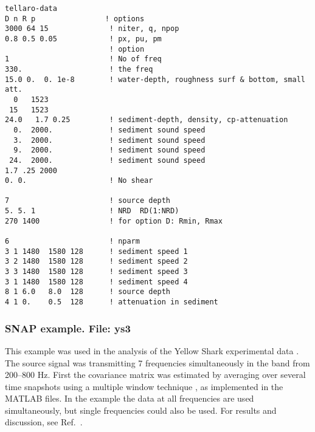 \documentclass{saclantc}
\begin{document}
\small
\begin{verbatim}
tellaro-data
D n R p                ! options 
3000 64 15              ! niter, q, npop
0.8 0.5 0.05            ! px, pu, pm
                        ! option
1                       ! No of freq
330.                    ! the freq
15.0 0.  0. 1e-8        ! water-depth, roughness surf & bottom, small att.
  0   1523           
 15   1523  
24.0   1.7 0.25         ! sediment-depth, density, cp-attenuation 
  0.  2000.             ! sediment sound speed
  3.  2000.             ! sediment sound speed
  9.  2000.             ! sediment sound speed
 24.  2000.             ! sediment sound speed
1.7 .25 2000
0. 0.                   ! No shear

7                       ! source depth
5. 5. 1                 ! NRD  RD(1:NRD)
270 1400                ! for option D: Rmin, Rmax 

6                       ! nparm         
3 1 1480  1580 128      ! sediment speed 1
3 2 1480  1580 128      ! sediment speed 2
3 3 1480  1580 128      ! sediment speed 3
3 1 1480  1580 128      ! sediment speed 4
8 1 6.0   8.0  128      ! source depth
4 1 0.    0.5  128      ! attenuation in sediment
 \end{verbatim}
\normalsize

\subsubsection{SNAP example. File: {\bf ys3}}
\label{se:ys3}
This example was used in the analysis of the Yellow Shark experimental
data \cite{hermand:ieee96}. The source signal was transmitting 7
frequencies simultaneously in the band from 200--800 Hz. First the
covariance matrix was estimated by averaging over several time
snapshots using a multiple window technique 
\cite{thompson:icassp94,meckl:icassp95}, as implemented in
the MATLAB files. 
In the example the data at all frequencies are used simultaneously,
but single frequencies could also be used. 
For results and discussion, see Ref.~\cite{hermand:ieee96}.


\end{document}
